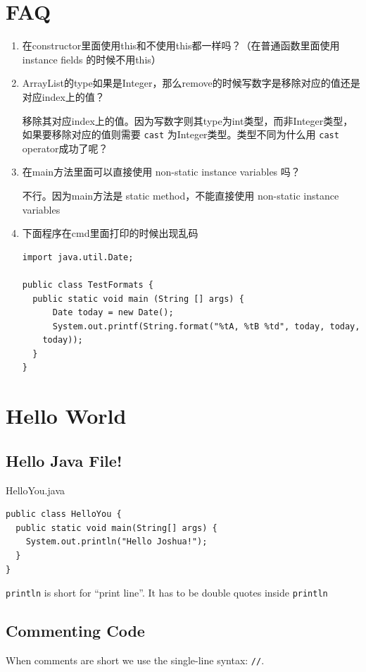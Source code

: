 \documentclass[a4paper, 12pt]{article}
\begin{document}
\section{FAQ}
\begin{enumerate}
\item 在constructor里面使用this和不使用this都一样吗？（在普通函数里面使用 instance fields 的时候不用this）

\item ArrayList的type如果是Integer，那么remove的时候写数字是移除对应的值还是对应index上的值？

移除其对应index上的值。因为写数字则其type为int类型，而非Integer类型，如果要移除对应的值则需要 \verb|cast| 为Integer类型。{\color{red}类型不同为什么用 \verb|cast| operator成功了呢？}

\item 在main方法里面可以直接使用 non-static instance variables 吗？

不行。因为main方法是 static method，不能直接使用 non-static instance variables

\item 下面程序在cmd里面打印的时候出现乱码
\begin{verbatim}
import java.util.Date;

public class TestFormats {
  public static void main (String [] args) {		
	  Date today = new Date();
	  System.out.printf(String.format("%tA, %tB %td", today, today, 
    today));
  }
}
\end{verbatim}

\end{enumerate}


\section{Hello World}
\subsection{Hello Java File!}
HelloYou.java

\begin{verbatim}
public class HelloYou {
  public static void main(String[] args) {
    System.out.println("Hello Joshua!");
  }
}
\end{verbatim}
\verb|println| is short for ``print line''. It has to be double quotes inside \verb|println|

\subsection{Commenting Code}
When comments are short we use the single-line syntax: \verb|//|.
\end{document}
